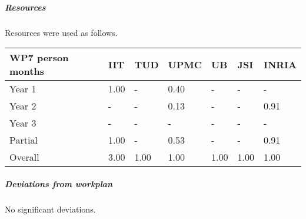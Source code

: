 

\subparagraph{Resources}

Resources were used as follows.

\begin{center}
\begin{tabular}{|C{1.5cm}|C{1.5cm}|C{1.5cm}|C{2cm}|C{2cm}|C{2cm}|C{2cm}|}
\hline
\footnotesize \textbf{WP7 person months}& \footnotesize \textbf{IIT}&\footnotesize \textbf{TUD}&\footnotesize \textbf{UPMC}& \footnotesize \textbf{UB} &\footnotesize \textbf{JSI} & \footnotesize \textbf{INRIA} \\ \hline
\footnotesize Year 1 &  1.00 & -    & 0.40 & -    & -    & - \\  \hline
\footnotesize Year 2 &  -    & -    & 0.13 & -    & -    & 0.91 \\  \hline
\footnotesize Year 3 &  -    & -    & -    & -    & -    & -    \\  \hline
\footnotesize Partial & 1.00 & -    & 0.53 & -    & -    & 0.91 \\ \hline \hline
\footnotesize Overall & 3.00 & 1.00 & 1.00 & 1.00 & 1.00 & 1.00 \\ \hline
\end{tabular}
\end{center}

\subparagraph{Deviations from workplan} 
No significant deviations. 
